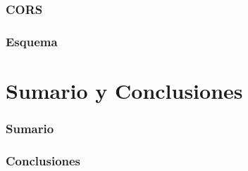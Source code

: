 \documentclass[a4paper,slidestop,xcolor=pst,blue]{beamer}
\begin{document}
\begin{frame}[c]
    \frametitle{CORS}
\end{frame}

\begin{frame}[c]
    \frametitle{Esquema}
\end{frame}

\section{Sumario y Conclusiones}

\begin{frame}[c]
    \frametitle{Sumario}
\end{frame}

\begin{frame}[c]
    \frametitle{Conclusiones}
\end{frame}
\end{document}
